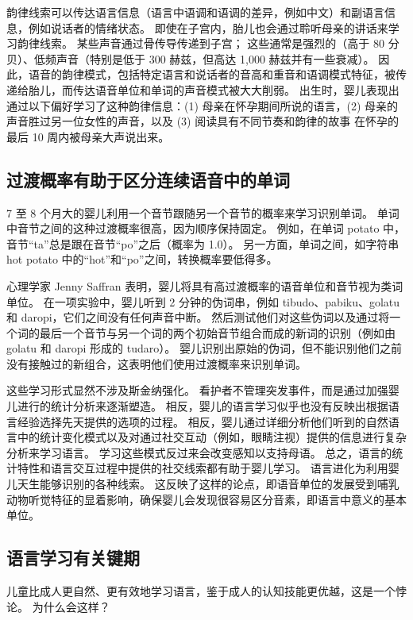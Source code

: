韵律线索可以传达语言信息（语言中语调和语调的差异，例如中文）和副语言信息，例如说话者的情绪状态。 即使在子宫内，胎儿也会通过聆听母亲的讲话来学习韵律线索。 某些声音通过骨传导传递到子宫； 这些通常是强烈的（高于 80 分贝）、低频声音（特别是低于 300 赫兹，但高达 1,000 赫兹并有一些衰减）。 因此，语音的韵律模式，包括特定语言和说话者的音高和重音和语调模式特征，被传递给胎儿，而传达语音单位和单词的声音模式被大大削弱。 出生时，婴儿表现出通过以下偏好学习了这种韵律信息：(1) 母亲在怀孕期间所说的语言，(2) 母亲的声音胜过另一位女性的声音，以及 (3) 阅读具有不同节奏和韵律的故事 在怀孕的最后 10 周内被母亲大声说出来。

\subsection{过渡概率有助于区分连续语音中的单词}

7 至 8 个月大的婴儿利用一个音节跟随另一个音节的概率来学习识别单词。 单词中音节之间的这种过渡概率很高，因为顺序保持固定。 例如，在单词 potato 中，音节“ta”总是跟在音节“po”之后（概率为 1.0）。 另一方面，单词之间，如字符串 hot potato 中的“hot”和“po”之间，转换概率要低得多。

心理学家 Jenny Saffran 表明，婴儿将具有高过渡概率的语音单位和音节视为类词单位。 在一项实验中，婴儿听到 2 分钟的伪词串，例如 tibudo、pabiku、golatu 和 daropi，它们之间没有任何声音中断。 然后测试他们对这些伪词以及通过将一个词的最后一个音节与另一个词的两个初始音节组合而成的新词的识别（例如由 golatu 和 daropi 形成的 tudaro）。 婴儿识别出原始的伪词，但不能识别他们之前没有接触过的新组合，这表明他们使用过渡概率来识别单词。

这些学习形式显然不涉及斯金纳强化。 看护者不管理突发事件，而是通过加强婴儿进行的统计分析来逐渐塑造。 相反，婴儿的语言学习似乎也没有反映出根据语言经验选择先天提供的选项的过程。 相反，婴儿通过详细分析他们听到的自然语言中的统计变化模式以及对通过社交互动（例如，眼睛注视）提供的信息进行复杂分析来学习语言。 学习这些模式反过来会改变感知以支持母语。 总之，语言的统计特性和语言交互过程中提供的社交线索都有助于婴儿学习。 语言进化为利用婴儿天生能够识别的各种线索。 这反映了这样的论点，即语音单位的发展受到哺乳动物听觉特征的显着影响，确保婴儿会发现很容易区分音素，即语言中意义的基本单位。

\subsection{语言学习有关键期}
儿童比成人更自然、更有效地学习语言，鉴于成人的认知技能更优越，这是一个悖论。 为什么会这样？

